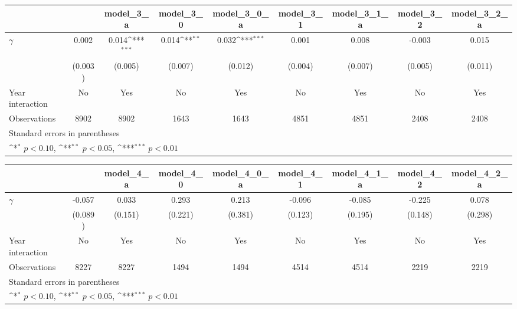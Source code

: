 {
\def\sym#1{\ifmmode^{#1}\else\(^{#1}\)\fi}
\begin{tabular}{l*{8}{c}}
\toprule
                &\multicolumn{1}{c}{}&\multicolumn{1}{c}{model\_3\_a}&\multicolumn{1}{c}{model\_3\_0}&\multicolumn{1}{c}{model\_3\_0\_a}&\multicolumn{1}{c}{model\_3\_1}&\multicolumn{1}{c}{model\_3\_1\_a}&\multicolumn{1}{c}{model\_3\_2}&\multicolumn{1}{c}{model\_3\_2\_a}\\
\midrule
$\gamma$        &    0.002         &    0.014\sym{***}&    0.014\sym{**} &    0.032\sym{***}&    0.001         &    0.008         &   -0.003         &    0.015         \\
                &  (0.003)         &  (0.005)         &  (0.007)         &  (0.012)         &  (0.004)         &  (0.007)         &  (0.005)         &  (0.011)         \\
\addlinespace
Year interaction &       No         &      Yes         &       No         &      Yes         &       No         &      Yes         &       No         &      Yes         \\
\midrule
Observations    &     8902         &     8902         &     1643         &     1643         &     4851         &     4851         &     2408         &     2408         \\
\bottomrule
\multicolumn{9}{l}{\footnotesize Standard errors in parentheses}\\
\multicolumn{9}{l}{\footnotesize \sym{*} \(p<0.10\), \sym{**} \(p<0.05\), \sym{***} \(p<0.01\)}\\
\end{tabular}
}
{
\def\sym#1{\ifmmode^{#1}\else\(^{#1}\)\fi}
\begin{tabular}{l*{8}{c}}
\toprule
                &\multicolumn{1}{c}{}&\multicolumn{1}{c}{model\_4\_a}&\multicolumn{1}{c}{model\_4\_0}&\multicolumn{1}{c}{model\_4\_0\_a}&\multicolumn{1}{c}{model\_4\_1}&\multicolumn{1}{c}{model\_4\_1\_a}&\multicolumn{1}{c}{model\_4\_2}&\multicolumn{1}{c}{model\_4\_2\_a}\\
\midrule
$\gamma$        &   -0.057         &    0.033         &    0.293         &    0.213         &   -0.096         &   -0.085         &   -0.225         &    0.078         \\
                &  (0.089)         &  (0.151)         &  (0.221)         &  (0.381)         &  (0.123)         &  (0.195)         &  (0.148)         &  (0.298)         \\
\addlinespace
Year interaction &       No         &      Yes         &       No         &      Yes         &       No         &      Yes         &       No         &      Yes         \\
\midrule
Observations    &     8227         &     8227         &     1494         &     1494         &     4514         &     4514         &     2219         &     2219         \\
\bottomrule
\multicolumn{9}{l}{\footnotesize Standard errors in parentheses}\\
\multicolumn{9}{l}{\footnotesize \sym{*} \(p<0.10\), \sym{**} \(p<0.05\), \sym{***} \(p<0.01\)}\\
\end{tabular}
}

